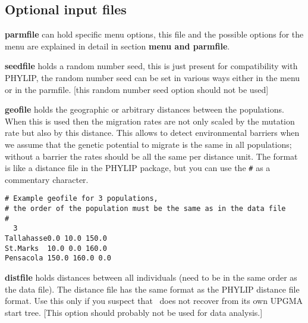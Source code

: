 \subsection{Optional input files}
\begin{description}
\item{\bf parmfile} can hold specific menu options, this file and the possible options for the menu are explained in detail in section {\bf menu and parmfile}.
\item{\bf seedfile} holds a random number seed, this is just present for compatibility with PHYLIP, the random number seed can be set in various
ways either in the menu or in the parmfile. [this random number seed option should not be used]
\item{\bf geofile} holds the geographic or arbitrary distances between the populations. When this is used then the migration rates are not only scaled by the mutation rate but also by this distance. This allows to detect environmental barriers when we assume that the genetic potential to migrate is the same in all populations; without a barrier the rates should be all the same per distance unit. The format is like a distance file in the PHYLIP package, but you can use the {\tt \#} as a commentary character.\\
\begin{small}
\begin{verbatim}
# Example geofile for 3 populations, 
# the order of the population must be the same as in the data file
# 
  3
Tallahasse0.0 10.0 150.0
St.Marks  10.0 0.0 160.0
Pensacola 150.0 160.0 0.0
\end{verbatim}
\end{small}

\item{\bf distfile} holds distances between all individuals (need to be in the same order as the data file). The distance file has the same format as the PHYLIP distance file format. Use this only if you suspect that \migrate\ does not recover from its own UPGMA start tree. [This option should probably not be used for data analysis.]


\end{description}
